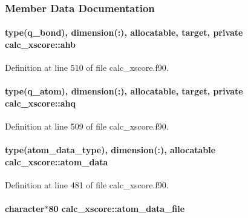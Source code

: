 \subsubsection{Member Data Documentation}
\hypertarget{classcalc__xscore_a82a74fabac5cb2a694cdb95bb55657db}{
\paragraph[{ahb}]{\setlength{\rightskip}{0pt plus 5cm}type({\bf q\-\_\-bond}), dimension(\-:), allocatable, target, private calc\-\_\-xscore\-::ahb\hspace{0.3cm}{\ttfamily [private]}}}\label{classcalc__xscore_a82a74fabac5cb2a694cdb95bb55657db}


Definition at line 510 of file calc\-\_\-xscore.\-f90.

\hypertarget{classcalc__xscore_a01f0fee76f9888f7cd8f02133635b474}{
\paragraph[{ahq}]{\setlength{\rightskip}{0pt plus 5cm}type({\bf q\-\_\-atom}), dimension(\-:), allocatable, target, private calc\-\_\-xscore\-::ahq\hspace{0.3cm}{\ttfamily [private]}}}\label{classcalc__xscore_a01f0fee76f9888f7cd8f02133635b474}


Definition at line 509 of file calc\-\_\-xscore.\-f90.

\hypertarget{classcalc__xscore_a4c371c592ca6bf193cabc56235abdfd3}{
\paragraph[{atom\-\_\-data}]{\setlength{\rightskip}{0pt plus 5cm}type({\bf atom\-\_\-data\-\_\-type}), dimension(\-:), allocatable calc\-\_\-xscore\-::atom\-\_\-data}}\label{classcalc__xscore_a4c371c592ca6bf193cabc56235abdfd3}


Definition at line 481 of file calc\-\_\-xscore.\-f90.

\hypertarget{classcalc__xscore_a3d333182ec47537c3c37dcc86e03338f}{
\paragraph[{atom\-\_\-data\-\_\-file}]{\setlength{\rightskip}{0pt plus 5cm}character$\ast$80 calc\-\_\-xscore\-::atom\-\_\-data\-\_\-file}}\label{classcalc__xscore_a3d333182ec47537c3c37dcc86e03338f}


